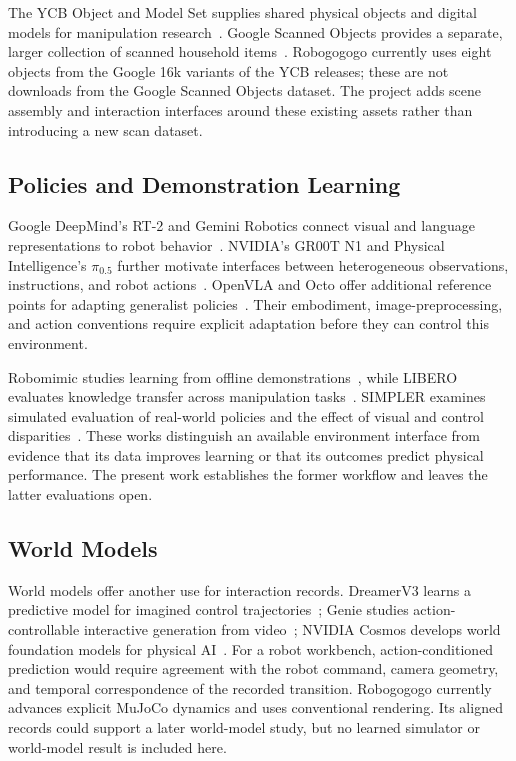 \documentclass[10pt]{article}
\begin{document}
The YCB Object and Model Set supplies shared physical objects and digital models for manipulation research~\cite{ycb,ycbdata}. Google Scanned Objects provides a separate, larger collection of scanned household items~\cite{gso}. Robogogogo currently uses eight objects from the Google 16k variants of the YCB releases; these are not downloads from the Google Scanned Objects dataset. The project adds scene assembly and interaction interfaces around these existing assets rather than introducing a new scan dataset.

\subsection{Policies and Demonstration Learning}
Google DeepMind's RT-2 and Gemini Robotics connect visual and language representations to robot behavior~\cite{rt2,geminirobotics}. NVIDIA's GR00T N1 and Physical Intelligence's $\pi_{0.5}$ further motivate interfaces between heterogeneous observations, instructions, and robot actions~\cite{gr00t,pi05}. OpenVLA and Octo offer additional reference points for adapting generalist policies~\cite{openvla,octo}. Their embodiment, image-preprocessing, and action conventions require explicit adaptation before they can control this environment.

Robomimic studies learning from offline demonstrations~\cite{robomimic}, while LIBERO evaluates knowledge transfer across manipulation tasks~\cite{libero}. SIMPLER examines simulated evaluation of real-world policies and the effect of visual and control disparities~\cite{simpler}. These works distinguish an available environment interface from evidence that its data improves learning or that its outcomes predict physical performance. The present work establishes the former workflow and leaves the latter evaluations open.

\subsection{World Models}
World models offer another use for interaction records. DreamerV3 learns a predictive model for imagined control trajectories~\cite{dreamerv3}; Genie studies action-controllable interactive generation from video~\cite{genie}; NVIDIA Cosmos develops world foundation models for physical AI~\cite{cosmos}. For a robot workbench, action-conditioned prediction would require agreement with the robot command, camera geometry, and temporal correspondence of the recorded transition. Robogogogo currently advances explicit MuJoCo dynamics and uses conventional rendering. Its aligned records could support a later world-model study, but no learned simulator or world-model result is included here.
\end{document}
